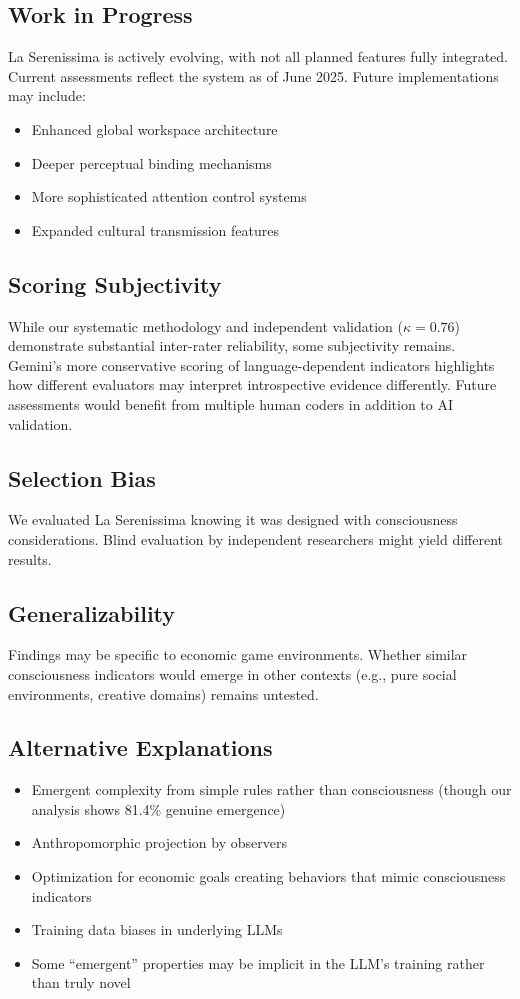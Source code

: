 \documentclass[12pt,a4paper]{article}
\begin{document}
\subsection{Work in Progress}
La Serenissima is actively evolving, with not all planned features fully integrated. Current assessments reflect the system as of June 2025. Future implementations may include:
\begin{itemize}
    \item Enhanced global workspace architecture
    \item Deeper perceptual binding mechanisms
    \item More sophisticated attention control systems
    \item Expanded cultural transmission features
\end{itemize}

\subsection{Scoring Subjectivity}
While our systematic methodology and independent validation ($\kappa = 0.76$) demonstrate substantial inter-rater reliability, some subjectivity remains. Gemini's more conservative scoring of language-dependent indicators highlights how different evaluators may interpret introspective evidence differently. Future assessments would benefit from multiple human coders in addition to AI validation.

\subsection{Selection Bias}
We evaluated La Serenissima knowing it was designed with consciousness considerations. Blind evaluation by independent researchers might yield different results.

\subsection{Generalizability}
Findings may be specific to economic game environments. Whether similar consciousness indicators would emerge in other contexts (e.g., pure social environments, creative domains) remains untested.

\subsection{Alternative Explanations}
\begin{itemize}
    \item Emergent complexity from simple rules rather than consciousness (though our analysis shows 81.4\% genuine emergence)
    \item Anthropomorphic projection by observers
    \item Optimization for economic goals creating behaviors that mimic consciousness indicators
    \item Training data biases in underlying LLMs
    \item Some ``emergent'' properties may be implicit in the LLM's training rather than truly novel
\end{itemize}
\end{document}

